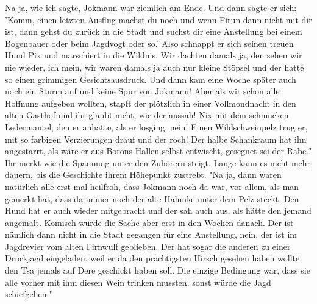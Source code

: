 Na ja, wie ich sagte, Jokmann war ziemlich am Ende. Und dann sagte er sich: 'Komm, einen letzten Ausflug machst du noch und wenn Firun dann nicht mit dir ist, dann gehst du zurück in die Stadt und suchst dir eine Anstellung bei einem Bogenbauer oder beim Jagdvogt oder so.'
Also schnappt er sich seinen treuen Hund Pix und marschiert in die Wildnis. Wir dachten damals ja, den sehen wir nie wieder, ich mein, wir waren damals ja auch nur kleine Stöpsel und der hatte so einen grimmigen Gesichtsausdruck. Und dann kam eine Woche später auch noch ein Sturm auf und keine Spur von Jokmann! Aber als wir schon alle Hoffnung aufgeben wollten, stapft der plötzlich in einer Vollmondnacht in den alten Gasthof und ihr glaubt nicht, wie der aussah! Nix mit dem schmucken Ledermantel, den er anhatte, als er losging, nein! Einen Wildschweinpelz trug er, mit so farbigen Verzierungen drauf und der roch! Der halbe Schankraum hat ihn angestarrt, als wäre er aus Borons Hallen selbst entwischt, gesegnet sei der Rabe."
Ihr merkt wie die Spannung unter den Zuhörern steigt. Lange kann es nicht mehr dauern, bis die Geschichte ihrem Höhepunkt zustrebt. "Na ja, dann waren natürlich alle erst mal heilfroh, dass Jokmann noch da war, vor allem, als man gemerkt hat, dass da immer noch der alte Halunke unter dem Pelz steckt. Den Hund hat er auch wieder mitgebracht und der sah auch aus, als hätte den jemand angemalt. Komisch wurde die Sache aber erst in den Wochen danach. Der ist nämlich dann nicht in die Stadt gegangen für eine Anstellung, nein, der ist im Jagdrevier vom alten Firnwulf geblieben. Der hat sogar die anderen zu einer Drückjagd eingeladen, weil er da den prächtigsten Hirsch gesehen haben wollte, den Tsa jemals auf Dere geschickt haben soll. Die einzige Bedingung war, dass sie alle vorher mit ihm diesen Wein trinken mussten, sonst würde die Jagd schiefgehen."

